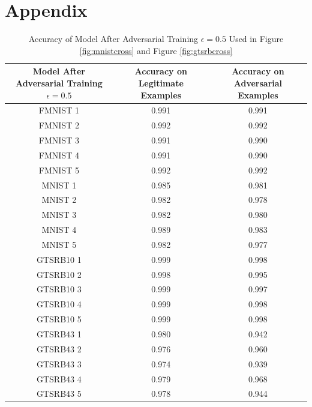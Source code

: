 \documentclass{article}
\begin{document}
\section{Appendix}
\begin{table} [htbp]
\centering
\begin{tabular}{ccc}
    \toprule
    Model After Adversarial Training \(\epsilon=0.5\) & Accuracy on Legitimate Examples & Accuracy on Adversarial Examples \\
    \midrule
    FMNIST 1 & 0.991 & 0.991 \\
    FMNIST 2 & 0.992 & 0.992 \\
    FMNIST 3 & 0.991 & 0.990 \\
    FMNIST 4 & 0.991 & 0.990 \\
    FMNIST 5 & 0.992 & 0.992 \\
    MNIST 1 & 0.985 & 0.981 \\
    MNIST 2 & 0.982 & 0.978 \\
    MNIST 3 & 0.982 & 0.980 \\
    MNIST 4 & 0.989 & 0.983 \\
    MNIST 5 & 0.982 & 0.977 \\

    GTSRB10 1 & 0.999 & 0.998 \\
    GTSRB10 2 & 0.998 & 0.995 \\
    GTSRB10 3 & 0.999 & 0.997 \\
    GTSRB10 4 & 0.999 & 0.998 \\
    GTSRB10 5 & 0.999 & 0.998 \\

    GTSRB43 1 & 0.980 & 0.942 \\
    GTSRB43 2 & 0.976 & 0.960 \\
    GTSRB43 3 & 0.974 & 0.939 \\
    GTSRB43 4 & 0.979 & 0.968 \\
    GTSRB43 5 & 0.978 & 0.944 \\
    \bottomrule
\end{tabular}
\caption{\label{tab:acc5adv} Accuracy of Model After Adversarial Training \(\epsilon=0.5\) Used in Figure \ref{fig:mnistcross} and Figure \ref{fig:gtsrbcross} }
\end{table}
\end{document}
